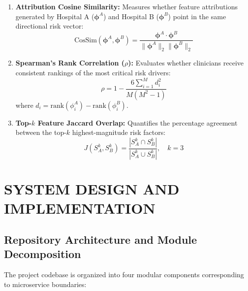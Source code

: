\documentclass[12pt,a4paper,oneside]{report}
\begin{document}
\begin{enumerate}
    \item \textbf{Attribution Cosine Similarity:} Measures whether feature attributions generated by Hospital A ($\boldsymbol{\phi}^A$) and Hospital B ($\boldsymbol{\phi}^B$) point in the same directional risk vector:
    \begin{equation}
        \text{CosSim}(\boldsymbol{\phi}^A, \boldsymbol{\phi}^B) = \frac{\boldsymbol{\phi}^A \cdot \boldsymbol{\phi}^B}{\|\boldsymbol{\phi}^A\|_2 \|\boldsymbol{\phi}^B\|_2}
    \end{equation}
    \item \textbf{Spearman's Rank Correlation ($\rho$):} Evaluates whether clinicians receive consistent rankings of the most critical risk drivers:
    \begin{equation}
        \rho = 1 - \frac{6 \sum_{i=1}^{M} d_i^2}{M(M^2 - 1)}
    \end{equation}
    where $d_i = \text{rank}(\phi_i^A) - \text{rank}(\phi_i^B)$.
    \item \textbf{Top-$k$ Feature Jaccard Overlap:} Quantifies the percentage agreement between the top-$k$ highest-magnitude risk factors:
    \begin{equation}
        J(S_A^k, S_B^k) = \frac{|S_A^k \cap S_B^k|}{|S_A^k \cup S_B^k|}, \quad k=3
    \end{equation}
\end{enumerate}



\chapter{SYSTEM DESIGN AND IMPLEMENTATION}

\section{Repository Architecture and Module Decomposition}
The project codebase is organized into four modular components corresponding to microservice boundaries:
\end{document}
